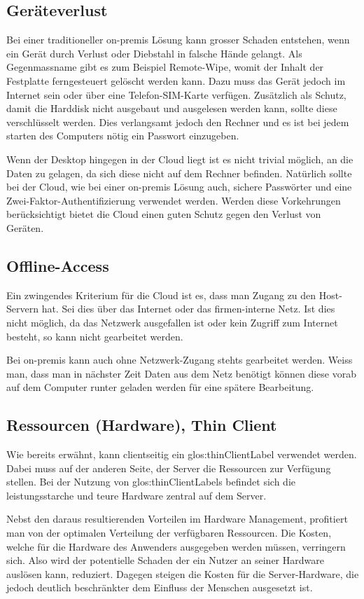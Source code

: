 \subsection{Geräteverlust}
Bei einer traditioneller on-premis Lösung kann grosser Schaden entstehen, wenn ein Gerät durch Verlust oder Diebstahl in falsche Hände gelangt.
Als Gegenmassname gibt es zum Beispiel Remote-Wipe, womit der Inhalt der Festplatte ferngesteuert gelöscht werden kann. Dazu muss das Gerät jedoch im Internet sein oder über eine Telefon-SIM-Karte verfügen.
Zusätzlich als Schutz, damit die Harddisk nicht ausgebaut und ausgelesen werden kann, sollte diese verschlüsselt werden. Dies verlangsamt jedoch den Rechner und es ist bei jedem starten des Computers nötig ein Passwort einzugeben.

Wenn der Desktop hingegen in der Cloud liegt ist es nicht trivial möglich, an die Daten zu gelagen, da sich diese nicht auf dem Rechner befinden.
Natürlich sollte bei der Cloud, wie bei einer on-premis Lösung auch, sichere Passwörter und eine Zwei-Faktor-Authentifizierung verwendet werden. Werden diese Vorkehrungen berücksichtigt bietet die Cloud einen guten Schutz gegen den Verlust von Geräten.

\subsection{Offline-Access}
Ein zwingendes Kriterium für die Cloud ist es, dass man Zugang zu den Host-Servern hat. Sei dies über das Internet oder das firmen-interne Netz. Ist dies nicht möglich, da das Netzwerk ausgefallen ist oder kein Zugriff zum Internet besteht, so kann nicht gearbeitet werden.

Bei on-premis kann auch ohne Netzwerk-Zugang stehts gearbeitet werden. Weiss man, dass man in nächster Zeit Daten aus dem Netz benötigt können diese vorab auf dem Computer runter geladen werden für eine spätere Bearbeitung.

\subsection{Ressourcen (Hardware), Thin Client}
Wie bereits erwähnt, kann clientseitig ein \gls{glos:thinClientLabel} verwendet werden. Dabei muss auf der anderen Seite, der Server die Ressourcen zur Verfügung stellen.
Bei der Nutzung von \glspl{glos:thinClientLabel} befindet sich die leistungsstarche und teure Hardware zentral auf dem Server.

Nebst den daraus resultierenden Vorteilen im Hardware Management, profitiert man von der optimalen Verteilung der verfügbaren Ressourcen.
Die Kosten, welche für die Hardware des Anwenders ausgegeben werden müssen, verringern sich.
Also wird der potentielle Schaden der ein Nutzer an seiner Hardware auslösen kann, reduziert.
Dagegen steigen die Kosten für die Server-Hardware, die jedoch deutlich beschränkter dem Einfluss der Menschen ausgesetzt ist.

